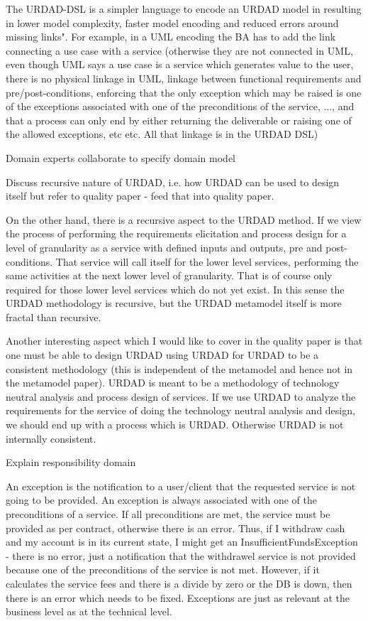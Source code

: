 The URDAD-DSL is a simpler language to encode an URDAD model in resulting in lower model complexity, faster model encoding and reduced errors around missing links". For example, in a UML encoding the BA has to add the link connecting a use case with a service (otherwise they are not connected in UML, even though UML says a use case is a service which generates value to the user, there is no physical linkage in UML, linkage between functional requirements and pre/post-conditions, enforcing that the only exception which may be raised is one of the exceptions associated with one of the preconditions of the service, ..., and that a process can only end by either returning the deliverable or raising one of the allowed exceptions, etc etc. All that linkage is in the URDAD DSL)





Domain experts collaborate to specify domain model

Discuss recursive nature of URDAD, i.e. how URDAD can be used to design itself but refer to quality paper - feed that into quality paper.

On the other hand, there is a recursive aspect to the URDAD method. If
we view the process of performing the requirements elicitation and
process design for  a level of granularity as a service with defined
inputs and outputs, pre and post-conditions. That service will call
itself for the lower level services, performing the same activities at
the next lower level of granularity. That is of course only required for
those lower level services which do not yet exist. In this sense the
URDAD methodology is recursive, but the URDAD metamodel itself is more
fractal than recursive.

Another interesting aspect which I would like to cover in the quality
paper is that one must be able to design URDAD using URDAD for URDAD to
be a consistent methodology (this is independent of the metamodel and
hence not in the metamodel paper). URDAD is meant to be a methodology of
technology neutral analysis and process design of services. If we use
URDAD to analyze the requirements for the service of doing the
technology neutral analysis and design, we should end up with a process
which is URDAD. Otherwise URDAD is not internally consistent.


Explain responsibility domain

An exception is the notification to a user/client that the requested service is not going to be provided. An exception is always associated with one of the preconditions of a service. If all preconditions are met, the service must be provided as per contract, otherwise there is an error. Thus, if I withdraw cash and my account is in its current state, I might get an InsufficientFundsException - there is no error, just a notification that the withdrawel service is not provided because one of the preconditions of the service is not met. However, if it calculates the service fees and there is a divide by zero or the DB is down, then there is an error which needs to be fixed. Exceptions are just as relevant at the business level as at the technical level.






